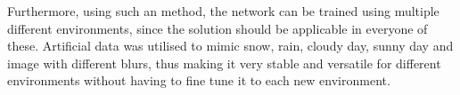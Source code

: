 \documentclass[../Head/Main.tex]{subfiles}
\begin{document}
\clearpage
Furthermore, using such an method, the network can be trained using multiple different environments, since the solution should be applicable in everyone of these. Artificial data was utilised to mimic snow, rain, cloudy day, sunny day and image with different blurs, thus making it very stable and versatile for different environments without having to fine tune it to each new environment. 
\end{document}
